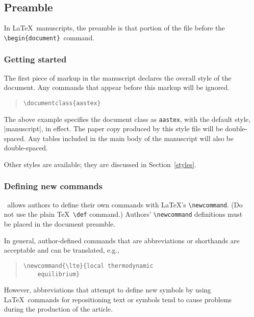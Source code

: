 \documentclass[preprint2]{aastex}
\begin{document}
\subsection{Preamble}\label{sec-preamble} 
 
In \LaTeX\ manuscripts, the preamble is that portion of the file before 
the \verb"\begin{document}"\  command. 
 
\subsubsection{Getting started} 
 
The first piece of markup in the manuscript declares the 
overall style of the document.  Any commands that appear before this 
markup will be ignored. 
\begin{quote} 
\begin{verbatim} 
\documentclass{aastex} 
\end{verbatim} 
\end{quote} 
The above example specifies the document class as 
\texttt{aastex}, 
with the 
default style, |manuscript|, 
in eff\-ect. 
The paper copy produced by this style file will be double-spaced. 
Any tables included in the main body of the manuscript will also be 
double-spaced. 
 
Other styles are available; 
they are discussed in Section~\ref{styles}. 
 
\subsubsection{Defining new commands} 
 
\aastex\ allows authors to define their own commands with 
\LaTeX's \verb"\newcommand". 
(Do not use the plain \TeX\ \verb"\def" command.) 
Authors' \verb"\newcommand" definitions must be placed in the 
document preamble. 
 
In general, author-defined commands that are 
abbreviations or shorthands are acceptable and can be translated, e.g., 
\begin{quote} 
\begin{verbatim} 
\newcommand{\lte}{local thermodynamic 
	equilibrium} 
\end{verbatim} 
\end{quote} 
However, abbreviations that attempt to define new symbols by using 
\LaTeX\ commands for repositioning text or symbols tend to 
cause problems during the production of the article. 
 
\end{document}
